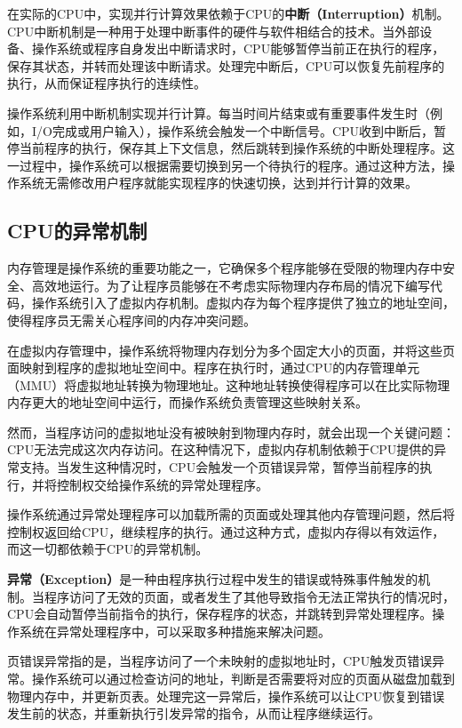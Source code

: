 在实际的CPU中，实现并行计算效果依赖于CPU的\textbf{中断（Interruption）}机制。CPU中断机制是一种用于处理中断事件的硬件与软件相结合的技术。当外部设备、操作系统或程序自身发出中断请求时，CPU能够暂停当前正在执行的程序，保存其状态，并转而处理该中断请求。处理完中断后，CPU可以恢复先前程序的执行，从而保证程序执行的连续性。

操作系统利用中断机制实现并行计算。每当时间片结束或有重要事件发生时（例如，I/O完成或用户输入），操作系统会触发一个中断信号。CPU收到中断后，暂停当前程序的执行，保存其上下文信息，然后跳转到操作系统的中断处理程序。这一过程中，操作系统可以根据需要切换到另一个待执行的程序。通过这种方法，操作系统无需修改用户程序就能实现程序的快速切换，达到并行计算的效果。

\subsection{CPU的异常机制}\label{sec:07-exceptions-003}

内存管理是操作系统的重要功能之一，它确保多个程序能够在受限的物理内存中安全、高效地运行。为了让程序员能够在不考虑实际物理内存布局的情况下编写代码，操作系统引入了虚拟内存机制。虚拟内存为每个程序提供了独立的地址空间，使得程序员无需关心程序间的内存冲突问题。

在虚拟内存管理中，操作系统将物理内存划分为多个固定大小的页面，并将这些页面映射到程序的虚拟地址空间中。程序在执行时，通过CPU的内存管理单元（MMU）将虚拟地址转换为物理地址。这种地址转换使得程序可以在比实际物理内存更大的地址空间中运行，而操作系统负责管理这些映射关系。

然而，当程序访问的虚拟地址没有被映射到物理内存时，就会出现一个关键问题：CPU无法完成这次内存访问。在这种情况下，虚拟内存机制依赖于CPU提供的异常支持。当发生这种情况时，CPU会触发一个页错误异常，暂停当前程序的执行，并将控制权交给操作系统的异常处理程序。

操作系统通过异常处理程序可以加载所需的页面或处理其他内存管理问题，然后将控制权返回给CPU，继续程序的执行。通过这种方式，虚拟内存得以有效运作，而这一切都依赖于CPU的异常机制。

\textbf{异常（Exception）}是一种由程序执行过程中发生的错误或特殊事件触发的机制。当程序访问了无效的页面，或者发生了其他导致指令无法正常执行的情况时，CPU会自动暂停当前指令的执行，保存程序的状态，并跳转到异常处理程序。操作系统在异常处理程序中，可以采取多种措施来解决问题。

页错误异常指的是，当程序访问了一个未映射的虚拟地址时，CPU触发页错误异常。操作系统可以通过检查访问的地址，判断是否需要将对应的页面从磁盘加载到物理内存中，并更新页表。处理完这一异常后，操作系统可以让CPU恢复到错误发生前的状态，并重新执行引发异常的指令，从而让程序继续运行。

